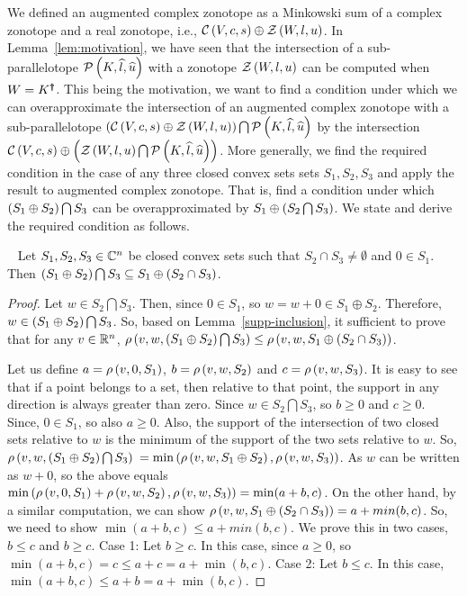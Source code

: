 We defined an augmented complex zonotope as a Minkowski sum of a
complex zonotope and a real zonotope, i.e.,
$\cz{V}{c}{s}\oplus\zon{W}{l}{u}$.  In Lemma~\ref{lem:motivation}, we
have seen that the intersection of a sub-parallelotope
$\sptope{K}{\wh{l}}{\wh{u}}$ with a zonotope $\zon{W}{l}{u}$ can be
computed when $W=\pinv{K}$.  This being the motivation, we want to
find a condition under which we can overapproximate the intersection
of an augmented complex zonotope with a sub-parallelotope
$\lt(\cz{V}{c}{s}\oplus\zon{W}{l}{u}\rt)\bigcap\sptope{K}{\wh{l}}{\wh{u}}$
by the intersection
$\cz{V}{c}{s}\oplus\lt(\zon{W}{l}{u}\bigcap\sptope{K}{\wh{l}}{\wh{u}}\rt)$.
More generally, we find the required condition in the case of any
three closed convex sets sets $S_1,S_2,S_3$ and apply the result to
augmented complex zonotope.  That is, find a condition under which
$\lt(S_1\oplus S_2\rt)\bigcap S_3$ can be overapproximated by
$S_1\oplus\lt(S_2\bigcap S_3\rt)$.  We state and derive the required
condition as follows.
%
\begin{lemma}~\label{gen-int}
Let $S_1,S_2,S_3\in\complexset^n$ be closed convex sets such that
$S_2\cap S_3\neq \emptyset$ and $0\in S_1$.  Then $\lt(S_1\oplus S_2\rt)\bigcap
S_3\subseteq S_1\oplus\lt(S_2\cap S_3\rt)$.
\end{lemma}
\begin{proof}
 Let $w\in S_2\bigcap S_3$.  Then, since $0\in S_1$, so $w=w+0\in
 S_1\oplus S_2$.  Therefore, $w\in \lt(S_1\oplus S_2\rt)\bigcap S_3$.
 So, based on Lemma~\ref{supp-inclusion}, it sufficient to prove that
 for any $v\in\realset^n$, $\support{w}{v}{\lt(S_1\oplus
   S_2\rt)\bigcap S_3}\leq \support{w}{v}{S_1\oplus\lt(S_2\cap
   S_3\rt)}$.

Let us define $a = \support{0}{v}{S_1}$, $b=\support{w}{v}{S_2}$ and
$c = \support{w}{v}{S_3}$.  It is easy to see that if a point belongs
to a set, then relative to that point, the support in any direction is
always greater than zero.  Since $w\in S_2\bigcap S_3$, so $b\geq 0$
and $c\geq 0$.  Since, $0\in S_1$, so also $a\geq 0$.  Also, the
support of the intersection of two closed sets relative to $w$ is the
minimum of the support of the two sets relative to $w$.  So,
$\support{w}{v}{\lt(S_1\oplus S_2\rt)\bigcap S_3}$ $=
\min\lt(\support{w}{v}{S_1\oplus S_2},\support{w}{v}{S_3}\rt)$.  As
$w$ can be written as $w+0$, so the above equals
$\min\lt(\support{0}{v}{S_1}+\support{w}{v}{S_2},\support{w}{v}{S_3}\rt)
= \min(a+b,c)$.  On the other hand, by a similar computation, we can
show $\support{w}{v}{S_1\oplus\lt(S_2\cap S_3\rt)} = a+min(b,c)$.  So,
we need to show $\min(a+b,c)\leq a+min(b,c)$.  We prove this in two
cases, $b\leq c$ and $b\geq c$. Case 1: Let $b\geq c$.  In this case,
since $a\geq 0$, so
$\min(a+b,c) = c \leq a+c = a+\min(b,c)$.
Case 2: Let $b\leq c$.  In this case, $\min(a+b,c)\leq a+b = a+\min(b,c)$.
\end{proof}

